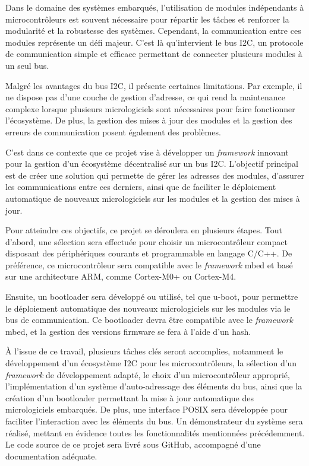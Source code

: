 Dans le domaine des systèmes embarqués, l'utilisation de modules indépendants à microcontrôleurs est souvent nécessaire pour répartir les tâches et renforcer la modularité et la robustesse des systèmes.
Cependant, la communication entre ces modules représente un défi majeur.
C'est là qu'intervient le bus I2C, un protocole de communication simple et efficace permettant de connecter plusieurs modules à un seul bus.

Malgré les avantages du bus I2C, il présente certaines limitations.
Par exemple, il ne dispose pas d'une couche de gestion d'adresse, ce qui rend la maintenance complexe lorsque plusieurs micrologiciels sont nécessaires pour faire fonctionner l'écosystème.
De plus, la gestion des mises à jour des modules et la gestion des erreurs de communication posent également des problèmes.

C'est dans ce contexte que ce projet vise à développer un \textit{\gls{framework}} innovant pour la gestion d'un écosystème décentralisé sur un bus I2C.
L'objectif principal est de créer une solution qui permette de gérer les adresses des modules, d'assurer les communications entre ces derniers, ainsi que de faciliter le déploiement automatique de nouveaux micrologiciels sur les modules et la gestion des mises à jour.

Pour atteindre ces objectifs, ce projet se déroulera en plusieurs étapes.
Tout d'abord, une sélection sera effectuée pour choisir un microcontrôleur compact disposant des périphériques courants et programmable en langage C/C++.
De préférence, ce microcontrôleur sera compatible avec le \textit{\gls{framework}} mbed et basé sur une architecture ARM, comme Cortex-M0+ ou Cortex-M4.

Ensuite, un bootloader sera développé ou utilisé, tel que u-boot, pour permettre le déploiement automatique des nouveaux micrologiciels sur les modules via le bus de communication.
Ce bootloader devra être compatible avec le \textit{\gls{framework}} mbed, et la gestion des versions firmware se fera à l'aide d'un hash.

À l'issue de ce travail, plusieurs tâches clés seront accomplies, notamment le développement d'un écosystème I2C pour les microcontrôleurs, la sélection d'un \textit{\gls{framework}} de développement adapté, le choix d'un microcontrôleur approprié, l'implémentation d'un système d'auto-adressage des éléments du bus, ainsi que la création d'un bootloader permettant la mise à jour automatique des micrologiciels embarqués.
De plus, une interface POSIX sera développée pour faciliter l'interaction avec les éléments du bus.
Un démonstrateur du système sera réalisé, mettant en évidence toutes les fonctionnalités mentionnées précédemment.
Le code source de ce projet sera livré sous GitHub, accompagné d'une documentation adéquate.

